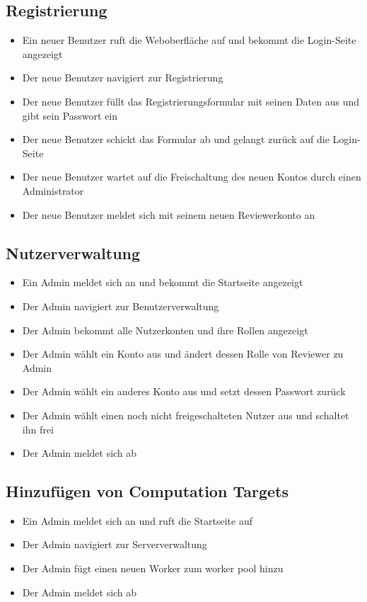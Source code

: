 \subsection*{Registrierung}
\begin{itemize}
    \item Ein neuer Benutzer ruft die Weboberfläche auf und bekommt die Login-Seite angezeigt
    \item Der neue Benutzer navigiert zur Registrierung
    \item Der neue Benutzer füllt das Registrierungsformular mit seinen Daten aus und gibt sein Passwort ein
    \item Der neue Benutzer schickt das Formular ab und gelangt zurück auf die Login-Seite
    \item Der neue Benutzer wartet auf die Freischaltung des neuen Kontos durch einen Administrator
    \item Der neue Benutzer meldet sich mit seinem neuen \Gls{Reviewer}konto an %
\end{itemize}

\subsection*{Nutzerverwaltung}
\begin{itemize}
    \item Ein \Gls{Admin} meldet sich an und bekommt die Startseite angezeigt
    \item Der \Gls{Admin} navigiert zur Benutzerverwaltung
    \item Der \Gls{Admin} bekommt alle Nutzerkonten und ihre Rollen angezeigt
    \item Der \Gls{Admin} wählt ein Konto aus und ändert dessen Rolle von \Gls{Reviewer} zu \Gls{Admin}
    \item Der \Gls{Admin} wählt ein anderes Konto aus und setzt dessen Passwort zurück
    \item Der \Gls{Admin} wählt einen noch nicht freigeschalteten Nutzer aus und schaltet ihn frei
    \item Der \Gls{Admin} meldet sich ab
\end{itemize}


\subsection*{Hinzufügen von Computation Targets}
\begin{itemize}
    \item Ein \Gls{Admin} meldet sich an und ruft die Startseite auf
    \item Der \Gls{Admin} navigiert zur Serververwaltung
    \item Der \gls{Admin} fügt einen neuen Worker zum worker pool hinzu
    \item Der \gls{Admin} meldet sich ab
\end{itemize}
